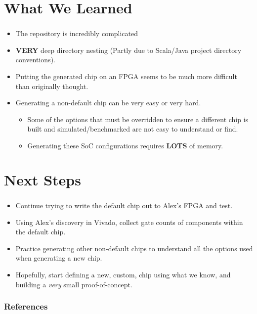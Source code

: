 \documentclass{../weeklyslides}
\begin{document}
\section{What We Learned}\label{sec:What_We_Learned}
\begin{frame}
  \frametitle{}
  \begin{itemize}
  \item The repository is incredibly complicated
  \item \textbf{VERY} deep directory nesting (Partly due to Scala/Java project directory conventions).
  \item Putting the generated chip on an FPGA seems to be much more difficult than originally thought.
  \item Generating a non-default chip can be very easy or very hard.
    \begin{itemize}
    \item Some of the options that must be overridden to ensure a different chip is built and simulated/benchmarked are not easy to understand or find.
	\item Generating these SoC configurations requires \textbf{LOTS} of memory.
    \end{itemize}
  \end{itemize}
\end{frame}

\section{Next Steps}\label{sec:Next_Steps}
\begin{frame}
  \frametitle{}
  \begin{itemize}
  \item Continue trying to write the default chip out to Alex's FPGA and test.
  \item Using Alex's discovery in Vivado, collect gate counts of components within the default chip.
  \item Practice generating other non-default chips to understand all the options used when generating a new chip.
  \item Hopefully, start defining a new, custom, chip using what we know, and building a \emph{very} small proof-of-concept.
  \end{itemize}
\end{frame}

\begin{frame}
  \frametitle{References}
  \printbibliography[heading=bibintoc]{}
\end{frame}
\end{document}
